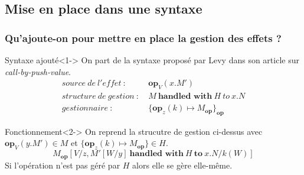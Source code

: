 \documentclass{beamer}
\begin{document}
\subsection{Mise en place dans une syntaxe}
\begin{frame}[fragile]
	\frametitle{Qu'ajoute-on pour mettre en place la gestion des effets ?}
	\begin{block}{Syntaxe ajouté}<1->
		On part de la syntaxe proposé par Levy dans son article sur \textit{call-by-push-value}.
		\begin{align*}
			source~de~l'effet~:~&\textbf{op}_V(x.M')\\
			structure~de~gestion~:~&M~\textbf{handled~with}~H~to~x.N\\
			gestionnaire~:~&\{\textbf{op}_{z}(k) \mapsto M_{\textbf{op}}\}_{\textbf{op}}
		\end{align*}
	\end{block}

	\begin{block}{Fonctionnement}<2->
		On reprend la strucutre de gestion ci-dessus 
		avec $\textbf{op}_V(y.M') \in M$ et $\{\textbf{op}_z(k) \mapsto M_ {\textbf{op}}\} \in H$.
			\alert{\[M_{\textbf{op}}[V/z,M'[W/y]~\textbf{handled~with}~H~\textbf{to}~x.N/k(W)]\]}
		Si l'opération n'est pas géré par $H$ alors elle se \alert{gère elle-même}.
	\end{block}
\end{frame}
\end{document}
